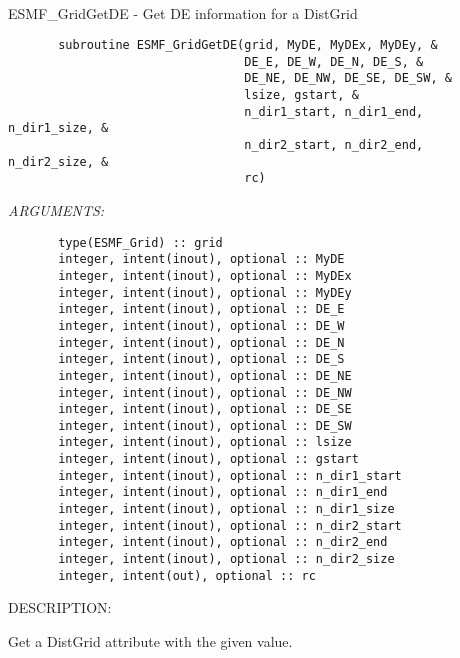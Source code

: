  
\mbox{}\hrulefill\ 
 
\subsubsection{}


       ESMF_GridGetDE - Get DE information for a DistGrid
 
\begin{verbatim}       subroutine ESMF_GridGetDE(grid, MyDE, MyDEx, MyDEy, &
                                 DE_E, DE_W, DE_N, DE_S, &
                                 DE_NE, DE_NW, DE_SE, DE_SW, &
                                 lsize, gstart, &
                                 n_dir1_start, n_dir1_end, n_dir1_size, &
                                 n_dir2_start, n_dir2_end, n_dir2_size, &
                                 rc)\end{verbatim}{\em ARGUMENTS:}
\begin{verbatim}       type(ESMF_Grid) :: grid
       integer, intent(inout), optional :: MyDE
       integer, intent(inout), optional :: MyDEx
       integer, intent(inout), optional :: MyDEy
       integer, intent(inout), optional :: DE_E
       integer, intent(inout), optional :: DE_W
       integer, intent(inout), optional :: DE_N
       integer, intent(inout), optional :: DE_S
       integer, intent(inout), optional :: DE_NE
       integer, intent(inout), optional :: DE_NW
       integer, intent(inout), optional :: DE_SE
       integer, intent(inout), optional :: DE_SW
       integer, intent(inout), optional :: lsize
       integer, intent(inout), optional :: gstart
       integer, intent(inout), optional :: n_dir1_start
       integer, intent(inout), optional :: n_dir1_end
       integer, intent(inout), optional :: n_dir1_size
       integer, intent(inout), optional :: n_dir2_start
       integer, intent(inout), optional :: n_dir2_end
       integer, intent(inout), optional :: n_dir2_size
       integer, intent(out), optional :: rc
 \end{verbatim}
{\sf DESCRIPTION:\\ }


       Get a DistGrid attribute with the given value.
  
